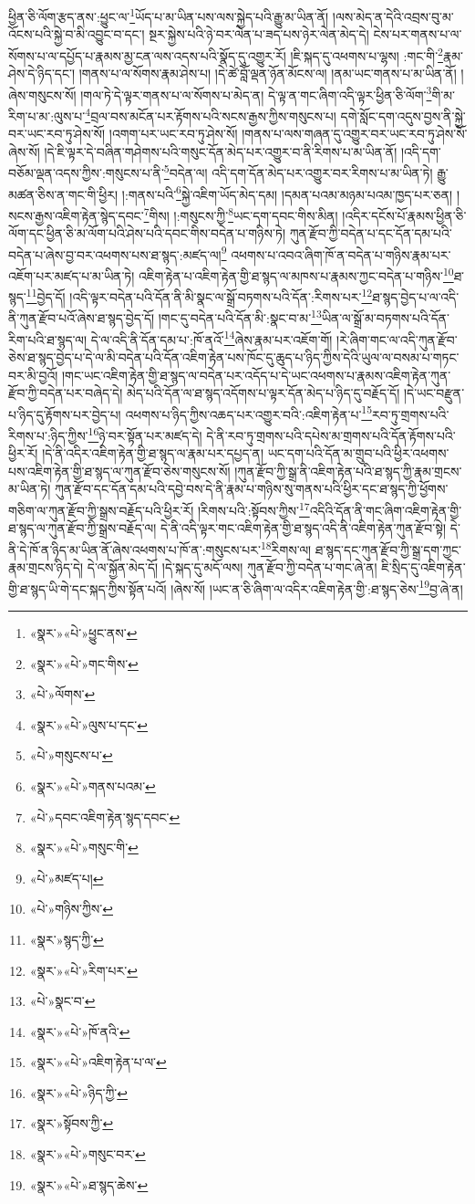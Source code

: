 ཕྱིན་ཅི་ལོག་རྩད་ནས་:ཕྱུང་ལ་\footnote{«སྣར་»«པེ་»ཕྱུང་ནས་}ཡོད་པ་མ་ཡིན་པས་ལས་སྐྱེད་པའི་རྒྱུ་མ་ཡིན་ནོ། །ལས་མེད་ན་དེའི་འབྲས་བུ་མ་འོངས་པའི་སྐྱེ་བ་མི་འབྱུང་བ་དང་། སྔར་སྐྱེས་པའི་ཉེ་བར་ལེན་པ་ཟད་པས་ཉེར་ལེན་མེད་དེ། ངེས་པར་གནས་པ་ལ་སོགས་པ་ལ་དཔྱོད་པ་རྣམས་མྱ་ངན་ལས་འདས་པའི་སྣོད་དུ་འགྱུར་རོ། །ཇི་སྐད་དུ་འཕགས་པ་ལྷས། :གང་གི་\footnote{«སྣར་»«པེ་»གང་གིས་}རྣམ་ཤེས་དེ་ཉིད་དང་། །གནས་པ་ལ་སོགས་རྣམ་ཤེས་པ། །དེ་ཚེ་བློ་ལྡན་ཉོན་མོངས་ལ། །ནམ་ཡང་གནས་པ་མ་ཡིན་ནོ། །ཞེས་གསུངས་སོ། །གལ་ཏེ་དེ་ལྟར་གནས་པ་ལ་སོགས་པ་མེད་ན། དེ་ལྟ་ན་གང་ཞིག་འདི་ལྟར་ཕྱིན་ཅི་ལོག་\footnote{«པེ་»ལོགས་}གི་མ་རིག་པ་མ་:ལུས་པ་\footnote{«སྣར་»«པེ་»ལུས་པ་དང་}བྲལ་བས་མངོན་པར་རྟོགས་པའི་སངས་རྒྱས་ཀྱིས་གསུངས་པ། དགེ་སློང་དག་འདུས་བྱས་ནི་སྐྱེ་བར་ཡང་རབ་ཏུ་ཤེས་སོ། །འགག་པར་ཡང་རབ་ཏུ་ཤེས་སོ། །གནས་པ་ལས་གཞན་དུ་འགྱུར་བར་ཡང་རབ་ཏུ་ཤེས་སོ་ཞེས་སོ། །དེ་ཇི་ལྟར་དེ་བཞིན་གཤེགས་པའི་གསུང་དོན་མེད་པར་འགྱུར་བ་ནི་རིགས་པ་མ་ཡིན་ནོ། །འདི་དག་བཅོམ་ལྡན་འདས་ཀྱིས་:གསུངས་པ་ནི་\footnote{«པེ་»གསུངས་པ་}བདེན་ལ། འདི་དག་དོན་མེད་པར་འགྱུར་བར་རིགས་པ་མ་ཡིན་ཏེ། རྒྱུ་མཚན་ཅིས་ན་གང་གི་ཕྱིར། །:གནས་པའི་\footnote{«སྣར་»«པེ་»གནས་པའམ་}སྐྱེ་འཇིག་ཡོད་མེད་དམ། །དམན་པའམ་མཉམ་པའམ་ཁྱད་པར་ཅན། །སངས་རྒྱས་འཇིག་རྟེན་སྙེད་དབང་\footnote{«པེ་»དབང་འཇིག་རྟེན་སྙད་དབང་}གིས། །:གསུངས་ཀྱི་\footnote{«སྣར་»«པེ་»གསུང་གི་}ཡང་དག་དབང་གིས་མིན། །འདིར་དངོས་པོ་རྣམས་ཕྱིན་ཅི་ལོག་དང་ཕྱིན་ཅི་མ་ལོག་པའི་ཤེས་པའི་དབང་གིས་བདེན་པ་གཉིས་ཏེ། ཀུན་རྫོབ་ཀྱི་བདེན་པ་དང་དོན་དམ་པའི་བདེན་པ་ཞེས་བྱ་བར་འཕགས་པས་ཐ་སྙད་:མཛད་ལ།\footnote{«པེ་»མཛད་པ།} འཕགས་པ་འབའ་ཞིག་ཁོ་ན་བདེན་པ་གཉིས་རྣམ་པར་འཇོག་པར་མཛད་པ་མ་ཡིན་ཏེ། འཇིག་རྟེན་པ་འཇིག་རྟེན་གྱི་ཐ་སྙད་ལ་མཁས་པ་རྣམས་ཀྱང་བདེན་པ་གཉིས་\footnote{«པེ་»གཉིས་ཀྱིས་}ཐ་སྙད་\footnote{«སྣར་»སྙད་ཀྱི་}བྱེད་དོ། །འདི་ལྟར་བདེན་པའི་དོན་ནི་མི་སྣང་ལ་སྒྲོ་བཏགས་པའི་དོན་:རིགས་པར་\footnote{«སྣར་»«པེ་»རིག་པར་}ཐ་སྙད་བྱེད་པ་ལ་འདི་ནི་ཀུན་རྫོབ་པའོ་ཞེས་ཐ་སྙད་བྱེད་དོ། །གང་དུ་བདེན་པའི་དོན་མི་:སྣང་བ་མ་\footnote{«པེ་»སྣང་བ་}ཡིན་ལ་སྒྲོ་མ་བཏགས་པའི་དོན་རིག་པའི་ཐ་སྙད་ལ། དེ་ལ་འདི་ནི་དོན་དམ་པ་:ཁོ་ནའོ་\footnote{«སྣར་»«པེ་»ཁོ་ནའི་}ཞེས་རྣམ་པར་འཇོག་གོ། །རེ་ཞིག་གང་ལ་འདི་ཀུན་རྫོབ་ཅེས་ཐ་སྙད་བྱེད་པ་དེ་ལ་མི་བདེན་པའི་དོན་འཇིག་རྟེན་པས་ཁོང་དུ་ཆུད་པ་ཉིད་ཀྱིས་དེའི་ཡུལ་ལ་བསམ་པ་གཏང་བར་མི་བྱའོ། །གང་ཡང་འཇིག་རྟེན་གྱི་ཐ་སྙད་ལ་བདེན་པར་འདོད་པ་དེ་ཡང་འཕགས་པ་རྣམས་འཇིག་རྟེན་ཀུན་རྫོབ་ཀྱི་བདེན་པར་བཞེད་དེ། མེད་པའི་དོན་ལ་ཐ་སྙད་འདོགས་པ་ལྟར་དོན་མེད་པ་ཉིད་དུ་བརྗོད་དོ། །དེ་ཡང་བརྫུན་པ་ཉིད་དུ་རྟོགས་པར་བྱེད་པ། འཕགས་པ་ཉིད་ཀྱིས་འཆད་པར་འགྱུར་བའི་:འཇིག་རྟེན་པ་\footnote{«སྣར་»«པེ་»འཇིག་རྟེན་པ་ལ་}རབ་ཏུ་གྲགས་པའི་རིགས་པ་:ཉིད་ཀྱིས་\footnote{«སྣར་»«པེ་»ཉིད་ཀྱི་}ཉེ་བར་སྟོན་པར་མཛད་དེ། དེ་ནི་རབ་ཏུ་གྲགས་པའི་དཔེས་མ་གྲགས་པའི་དོན་རྟོགས་པའི་ཕྱིར་རོ། །དེ་ནི་འདིར་འཇིག་རྟེན་གྱི་ཐ་སྙད་ལ་རྣམ་པར་དཔྱད་ན། ཡང་དག་པའི་དོན་མ་གྲུབ་པའི་ཕྱིར་འཕགས་པས་འཇིག་རྟེན་གྱི་ཐ་སྙད་ལ་ཀུན་རྫོབ་ཅེས་གསུངས་སོ། །ཀུན་རྫོབ་ཀྱི་སྒྲ་ནི་འཇིག་རྟེན་པའི་ཐ་སྙད་ཀྱི་རྣམ་གྲངས་མ་ཡིན་ཏེ། ཀུན་རྫོབ་དང་དོན་དམ་པའི་དབྱེ་བས་དེ་ནི་རྣམ་པ་གཉིས་སུ་གནས་པའི་ཕྱིར་དང་ཐ་སྙད་ཀྱི་ཕྱོགས་གཅིག་ལ་ཀུན་རྫོབ་ཀྱི་སྒྲས་བརྗོད་པའི་ཕྱིར་རོ། །རིགས་པའི་:སྟོབས་ཀྱིས་\footnote{«སྣར་»སྟོབས་ཀྱི་}འདིའི་དོན་ནི་གང་ཞིག་འཇིག་རྟེན་གྱི་ཐ་སྙད་ལ་ཀུན་རྫོབ་ཀྱི་སྒྲས་བརྗོད་ལ། དེ་ནི་འདི་ལྟར་གང་འཇིག་རྟེན་གྱི་ཐ་སྙད་འདི་ནི་འཇིག་རྟེན་ཀུན་རྫོབ་སྟེ། དེ་ནི་དེ་ཁོ་ན་ཉིད་མ་ཡིན་ནོ་ཞེས་འཕགས་པ་ཁོ་ན་:གསུངས་པར་\footnote{«སྣར་»«པེ་»གསུང་བར་}རིགས་ལ། ཐ་སྙད་དང་ཀུན་རྫོབ་ཀྱི་སྒྲ་དག་ཀྱང་རྣམ་གྲངས་ཉིད་དེ། དེ་ལ་སྐྱོན་མེད་དོ། །དེ་སྐད་དུ་མདོ་ལས། ཀུན་རྫོབ་ཀྱི་བདེན་པ་གང་ཞེ་ན། ཇི་སྲིད་དུ་འཇིག་རྟེན་གྱི་ཐ་སྙད་ཡི་གེ་དང་སྐད་ཀྱིས་སྟོན་པའོ། །ཞེས་སོ། །ཡང་ན་ཅི་ཞིག་ལ་འདིར་འཇིག་རྟེན་གྱི་:ཐ་སྙད་ཅེས་\footnote{«སྣར་»«པེ་»ཐ་སྙད་ཆེས་}བྱ་ཞེ་ན། 